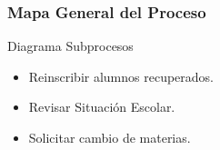 \subsubsection{Mapa General del Proceso}			%
Diagrama
Subprocesos
\begin{itemize}
\item Reinscribir alumnos recuperados.
\item Revisar Situación Escolar.
\item Solicitar cambio de materias.
\end{itemize}